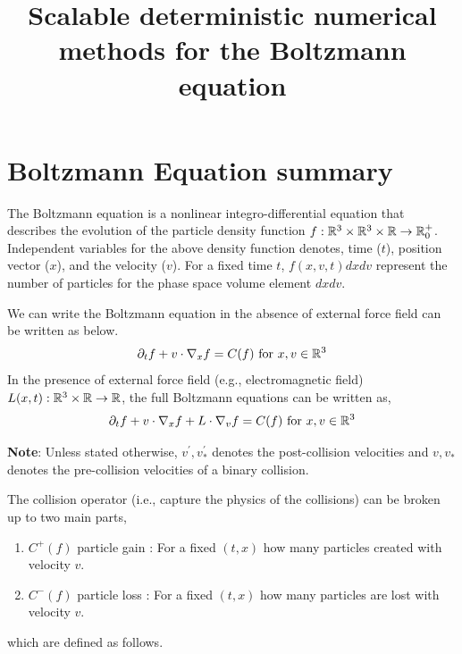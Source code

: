 \documentclass{article}[draft]
\title{Scalable deterministic numerical methods for the Boltzmann equation}
\begin{document}
\maketitle

\section{Boltzmann Equation summary}
The Boltzmann equation is a nonlinear integro-differential equation that describes the evolution of the particle density function $f : \mathbb{R}^3 \times \mathbb{R}^3 \times \mathbb{R} \rightarrow \mathbb{R}^{+}_0$. Independent variables for the above density function denotes, time ($t$), position vector ($x$), and the velocity ($v$). For a fixed time $t$, $f(x,v,t)dx dv$ represent the number of particles for the phase space volume element $dxdv$. 

We can write the Boltzmann equation in the absence of external force field can be written as below. 
\begin{equation}
    \partial_t f + v\cdot \nabla_x f = C(f) \text{ for } x,v \in \mathbb{R}^3 \label{eq:be}
\end{equation}
In the presence of external force field (e.g., electromagnetic field) $L(x,t) : \mathbb{R}^3 \times \mathbb{R} \rightarrow \mathbb{R}$, the full Boltzmann equations can be written as, 
\begin{equation}
    \partial_t f + v\cdot \nabla_x f  + L \cdot \nabla_v f = C(f) \text{ for } x,v \in \mathbb{R}^3 \label{eq:be_full}
\end{equation}


\textbf{Note}: Unless stated otherwise, $v^\prime,v_*^\prime$ denotes the post-collision velocities and $v,v_*$ denotes the pre-collision velocities of a binary collision.

The collision operator (i.e., capture the physics of the collisions) can be broken up to two main parts, 
\begin{enumerate}
    \item $C^+(f)$ particle gain : For a fixed $(t,x)$ how many particles created with velocity $v$.
    \item $C^-(f)$ particle loss : For a fixed $(t,x)$ how many particles are lost with velocity $v$.
\end{enumerate} which are defined as follows. 
\end{document}
